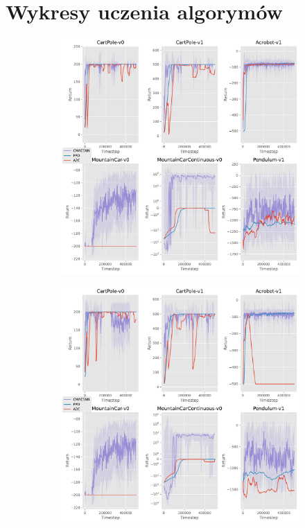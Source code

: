 \documentclass[12pt,a4paper]{article}
\begin{document}
\pagebreak
\appendix
\section{Wykresy uczenia algorymów}

\begin{figure}[ht!]
  \centering
  \begin{subfigure}[ht!]{0.35\textwidth}
    \includegraphics[width=\textwidth]{../plotting/plots/plot_all0.pdf}
    \caption{}
  \end{subfigure}
  \hspace{0.05\textwidth}
  \begin{subfigure}[ht!]{0.35\textwidth}
    \includegraphics[width=\textwidth]{../plotting/plots/plot_all1.pdf}
    \caption{}
  \end{subfigure}


\end{figure}
\end{document}
